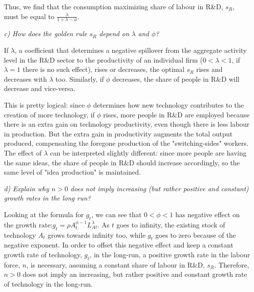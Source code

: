 \documentclass[11pt]{article} %
\begin{document}
\par Thus, we find that the consumption maximizing share of labour in R\&D, $s_R$, must be equal to $\frac{\lambda}{1+\lambda-\phi}$.





\pagebreak
\textit{c) How does the golden rule $s_R$ depend on $\lambda$ and $\phi$?}\par 

\par If $\lambda$, a coefficient that determines a negative spillover from the aggregate activity level in the R&D sector to the productivity of an individual firm ($0<\lambda<1$, if $\lambda=1$ there is no such effect), rises or decreases, the optimal $s_R$ rises and decreases with $\lambda$ too. Similarly, if $\phi$ decreases, the share of people in R&D will decrease and vice-versa.

\par This is pretty logical: since $\phi$ determines how new technology contributes to the creation of more technology, if $\phi$ rises, more people in R&D are employed because there is an extra gain on technology productivity, even though there is less labour in production. But the extra gain in productivity augments the total output produced, compensating the foregone production of the "switching-sides" workers. The effect of $\lambda$ can be interpreted slightly different: since more people are having the same ideas, the share of people in R&D should increase accordingly, so the same level of "idea production" is maintained.




\bigskip

\bigskip
\textit{d) Explain why $n > 0$ does not imply increasing (but rather positive and constant) growth rates in the long run?}\par

Looking at the formula for $g_t$, we can see that $0 < \phi < 1$ has negative effect on the growth rate:$g_t = \rho A_t^{\phi - 1} L_{At}^{\lambda}$. As $t$ goes to infinity, the existing stock of technology $A_t$ grows towards infinity too, while $g_t$ goes to zero because of the negative exponent. In order to offset this negative effect and keep a constant growth rate of technology, $g_t$, in the long-run, a positive growth rate in the labour force, $n$, is necessary, assuming a constant share of labour in R\&D, $s_R$. Therefore, $n > 0$ does not imply an increasing, but rather positive and constant growth rate of technology in the long-run.
\end{document}
